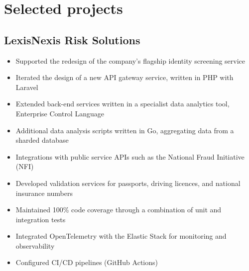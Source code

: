 \documentclass[a4paper,10pt]{article}
\begin{document}
\section*{Selected projects}


\subsection*{LexisNexis Risk Solutions \hfill {}}
\begin{itemize}
  \item Supported the redesign of the company's flagship identity screening service
  \item Iterated the design of a new API gateway service, written in PHP with Laravel
  \item Extended back-end services written in a specialist data analytics tool, Enterprise Control Language
  \item Additional data analysis scripts written in Go, aggregating data from a sharded database
  \item Integrations with public service APIs such as the National Fraud Initiative (NFI)
  \item Developed validation services for passports, driving licences, and national insurance numbers
  \item Maintained 100\% code coverage through a combination of unit and integration tests
  \item Integrated OpenTelemetry with the Elastic Stack for monitoring and observability
  \item Configured CI/CD pipelines (GitHub Actions)
\end{itemize}
\end{document}
